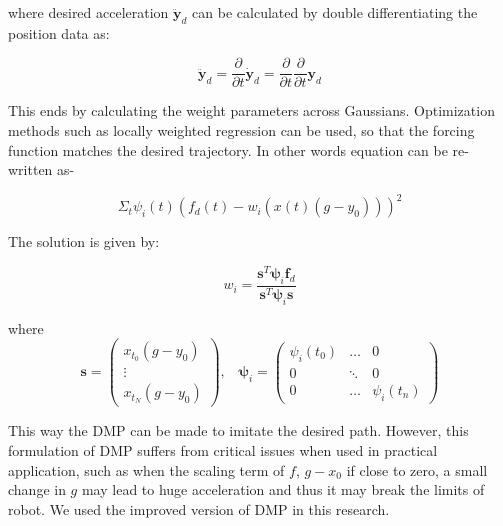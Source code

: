 \documentclass[sigconf]{acmart}
\begin{document}
where desired acceleration $\ddot{\textbf{y}}_d$ can be calculated by double differentiating the position data as:

\begin{equation*}
	\ddot{\textbf{y}}_d = \frac{\partial}{\partial t} \dot{\textbf{y}}_d = \frac{\partial}{\partial t} \frac{\partial}{\partial t} \textbf{y}_d
\end{equation*}

This ends by calculating the weight parameters across Gaussians. Optimization methods such as locally weighted regression can be used, so that the forcing function matches the desired trajectory. In other words equation can be re-written as-

\begin{equation}
	\Sigma_t \psi_i(t)(f_d(t) - w_i (x(t) (g - y_0)))^2
\end{equation}

The solution\cite{vijayakumar2000locally} is given by:

\begin{equation}
	w_i = \frac{\textbf{s}^T \pmb{\psi}_i \textbf{f}_d}{\textbf{s}^T \pmb{\psi}_i \textbf{s}}
\end{equation}

where
\begin{equation*}
	\textbf{s} = \left( \begin{array}{c}x_{t_0}(g - y_0) \\ \vdots \\ x_{t_N}(g - y_0) \end{array} \right), \;\;\; \pmb{\psi}_i = \left( \begin{array}{ccc} \psi_i(t_0) & \dots & 0 \\ 0 & \ddots & 0 \\ 0 & \dots & \psi_i(t_n) \end{array} \right)
\end{equation*}

This way the DMP can be made to imitate the desired path. However, this formulation of DMP suffers from critical issues when used in practical application, such as when the scaling term of $f$, $g-x_0$ if close to zero, a small change in $g$ may lead to huge acceleration and thus it may break the limits of robot. We used the improved version of DMP \cite{pastor2009learning} in this research.
\end{document}
